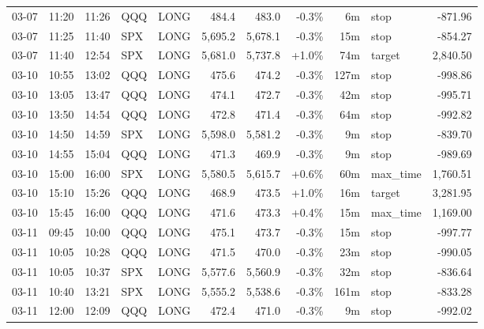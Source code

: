 \documentclass[11pt,a4paper,twoside]{article}
\begin{document}
\begin{center}
\begin{longtable}{>{\color{txtmain}}l l l l l r r r r >{\color{txtmain}}l r}
03-07 & 11:20 & 11:26 & QQQ & LONG & 484.4 & 483.0 & \textcolor{lossred}{-0.3\%} & 6m & stop & \textcolor{lossred}{-871.96} \\
03-07 & 11:25 & 11:40 & SPX & LONG & 5,695.2 & 5,678.1 & \textcolor{lossred}{-0.3\%} & 15m & stop & \textcolor{lossred}{-854.27} \\
03-07 & 11:40 & 12:54 & SPX & LONG & 5,681.0 & 5,737.8 & \textcolor{wingreen}{+1.0\%} & 74m & target & \textcolor{wingreen}{2,840.50} \\
03-10 & 10:55 & 13:02 & QQQ & LONG & 475.6 & 474.2 & \textcolor{lossred}{-0.3\%} & 127m & stop & \textcolor{lossred}{-998.86} \\
03-10 & 13:05 & 13:47 & QQQ & LONG & 474.1 & 472.7 & \textcolor{lossred}{-0.3\%} & 42m & stop & \textcolor{lossred}{-995.71} \\
03-10 & 13:50 & 14:54 & QQQ & LONG & 472.8 & 471.4 & \textcolor{lossred}{-0.3\%} & 64m & stop & \textcolor{lossred}{-992.82} \\
03-10 & 14:50 & 14:59 & SPX & LONG & 5,598.0 & 5,581.2 & \textcolor{lossred}{-0.3\%} & 9m & stop & \textcolor{lossred}{-839.70} \\
03-10 & 14:55 & 15:04 & QQQ & LONG & 471.3 & 469.9 & \textcolor{lossred}{-0.3\%} & 9m & stop & \textcolor{lossred}{-989.69} \\
03-10 & 15:00 & 16:00 & SPX & LONG & 5,580.5 & 5,615.7 & \textcolor{wingreen}{+0.6\%} & 60m & max\_time & \textcolor{wingreen}{1,760.51} \\
03-10 & 15:10 & 15:26 & QQQ & LONG & 468.9 & 473.5 & \textcolor{wingreen}{+1.0\%} & 16m & target & \textcolor{wingreen}{3,281.95} \\
03-10 & 15:45 & 16:00 & QQQ & LONG & 471.6 & 473.3 & \textcolor{wingreen}{+0.4\%} & 15m & max\_time & \textcolor{wingreen}{1,169.00} \\
03-11 & 09:45 & 10:00 & QQQ & LONG & 475.1 & 473.7 & \textcolor{lossred}{-0.3\%} & 15m & stop & \textcolor{lossred}{-997.77} \\
03-11 & 10:05 & 10:28 & QQQ & LONG & 471.5 & 470.0 & \textcolor{lossred}{-0.3\%} & 23m & stop & \textcolor{lossred}{-990.05} \\
03-11 & 10:05 & 10:37 & SPX & LONG & 5,577.6 & 5,560.9 & \textcolor{lossred}{-0.3\%} & 32m & stop & \textcolor{lossred}{-836.64} \\
03-11 & 10:40 & 13:21 & SPX & LONG & 5,555.2 & 5,538.6 & \textcolor{lossred}{-0.3\%} & 161m & stop & \textcolor{lossred}{-833.28} \\
03-11 & 12:00 & 12:09 & QQQ & LONG & 472.4 & 471.0 & \textcolor{lossred}{-0.3\%} & 9m & stop & \textcolor{lossred}{-992.02} \\

\end{longtable}
\end{center}
\end{document}
